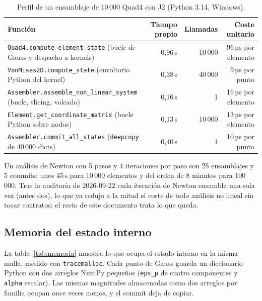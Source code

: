 \documentclass[11pt,letterpaper,oneside]{article}
\newcommand{\code}[1]{\texttt{#1}}
\begin{document}
\begin{table}[h]
\centering
\small
\begin{tabularx}{\textwidth}{Yrrr}
\toprule
Función & Tiempo propio & Llamadas & Coste unitario \\
\midrule
\code{Quad4.compute\_element\_state} (bucle de Gauss y despacho a kernels) & 0,96\,s & 10\,000 & 96\,µs por elemento \\
\code{VonMises2D.compute\_state} (envoltorio Python del kernel) & 0,38\,s & 40\,000 & 9\,µs por punto \\
\code{Assembler.assemble\_non\_linear\_system} (bucle, slicing, volcado) & 0,16\,s & 1 & 16\,µs por elemento \\
\code{Element.get\_coordinate\_matrix} (bucle Python sobre nodos) & 0,13\,s & 10\,000 & 13\,µs por elemento \\
\code{Assembler.commit\_all\_states} (\code{deepcopy} de 40\,000 dicts) & 0,40\,s & 1 & 10\,µs por punto \\
\bottomrule
\end{tabularx}
\caption{Perfil de un ensamblaje de 10\,000 Quad4 con J2 (Python 3.14, Windows).}
\label{tab:perfil}
\end{table}

Un análisis de Newton con 5 pasos y 4 iteraciones por paso son 25 ensamblajes y 5 commits: unos 45\,s para 10\,000 elementos y del orden de 8 minutos para 100\,000. Tras la auditoría de 2026-09-22 cada iteración de Newton ensambla una sola vez (antes dos), lo que ya redujo a la mitad el coste de todo análisis no lineal sin tocar contratos; el resto de este documento trata lo que queda.

\subsection{Memoria del estado interno}

La tabla~\ref{tab:memoria} muestra lo que ocupa el estado interno en la misma malla, medido con \code{tracemalloc}. Cada punto de Gauss guarda un diccionario Python con dos arreglos NumPy pequeños (\code{eps\_p} de cuatro componentes y \code{alpha} escalar). Las mismas magnitudes almacenadas como dos arreglos por familia ocupan once veces menos, y el commit deja de copiar.
\end{document}
